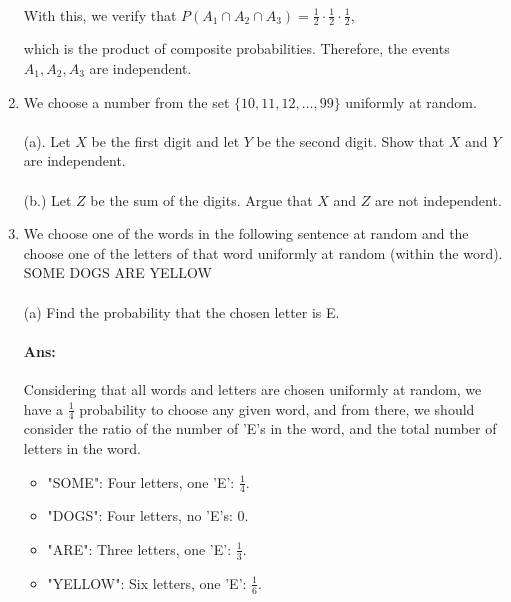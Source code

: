 \documentclass{article}
\begin{document}
\begin{enumerate}
    \paragraph{}With this, we verify that $P(A_1 \cap A_2 \cap A_3) = \frac{1}{2} \cdot \frac{1}{2} \cdot \frac{1}{2}$, 

    which is the product of composite probabilities. Therefore, the events $A_1, A_2, A_3$ are independent.
    \item We choose a number from the set $\{10, 11, 12, \ldots , 99\}$ uniformly at random.

    \paragraph{} (a). Let $X$ be the first digit and let $Y$ be the second digit. Show that $X$ and $Y$ are
independent.

    \paragraph{} (b.) Let $Z$ be the sum of the digits. Argue that $X$ and $Z$ are not independent.

\item We choose one of the words in the following sentence at random and the choose one of
the letters of that word uniformly at random (within the word).
SOME DOGS ARE YELLOW
\paragraph{}(a) Find the probability that the chosen letter is E.

\paragraph{Ans:} Considering that all words and letters are chosen uniformly at random, we have a
$\frac{1}{4}$ probability to choose any given word, and from there, we should consider the ratio of the number
of 'E's in the word, and the total number of letters in the word.
\begin{itemize}
    \item "SOME": Four letters, one 'E': $\frac{1}{4}$.
    \item "DOGS": Four letters, no 'E's: 0.
    \item "ARE": Three letters, one 'E': $\frac{1}{3}$.
    \item "YELLOW": Six letters, one 'E': $\frac{1}{6}$.
\end{itemize}


\end{enumerate}
\end{document}
